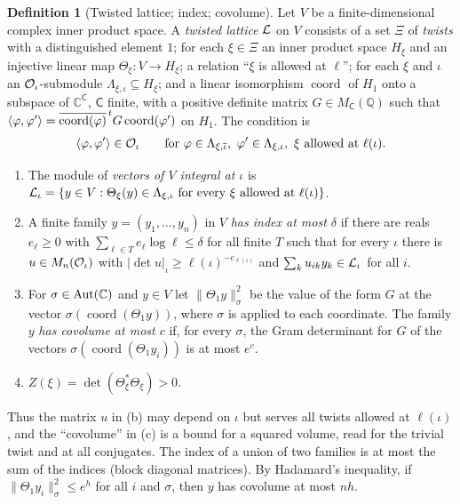 \documentclass[10pt]{amsart}
\theoremstyle{definition}
\newtheorem{definition}[theorem]{Definition}
\theoremstyle{remark}
\newcommand{\C}{\mathbb C}
\newcommand{\Q}{\mathbb Q}
\begin{document}
\begin{definition}[Twisted lattice; index; covolume]\label{def:au-lattice}
Let $V$ be a finite-dimensional complex inner product space. A \emph{twisted lattice} $\mathcal L$ on
$V$ consists of a set $\Xi$ of \emph{twists} with a distinguished element $1$; for each
$\xi\in\Xi$ an inner product space $H_\xi$ and an injective linear map
$\Theta_\xi\colon V\to H_\xi$; a relation ``$\xi$ is allowed at $\ell$''; for each $\xi$ and
$\iota$ an $\mathcal O_\iota$-submodule $\Lambda_{\xi,\iota}\subseteq H_\xi$; and a linear isomorphism
$\operatorname{coord}$ of $H_1$ onto a subspace of $\C^{\mathsf C}$, $\mathsf C$ finite, with a
positive definite matrix $G\in M_{\mathsf C}(\Q)$ such that
$\langle\varphi,\varphi'\rangle=\overline{\operatorname{coord}(\varphi)}^{\,t}G\operatorname{coord}(\varphi')$
on $H_1$. The condition is
\begin{equation}\label{eq:au-pairing}
\langle\varphi,\varphi'\rangle\in\mathcal O_\iota\qquad\text{for }\varphi\in\Lambda_{\xi,\overline{\iota}},\
\varphi'\in\Lambda_{\xi,\iota},\ \xi\text{ allowed at }\ell(\iota).
\end{equation}
\begin{enumerate}
\item[(a)] The module of \emph{vectors of $V$ integral at $\iota$} is
$\mathcal L_\iota=\{y\in V:\Theta_\xi(y)\in\Lambda_{\xi,\iota}\text{ for every }\xi\text{ allowed at }
\ell(\iota)\}$.
\item[(b)] A finite family $y=(y_1,\dots,y_n)$ in $V$ \emph{has index at most $\delta$} if there
are reals $e_\ell\ge0$ with $\sum_{\ell\in T}e_\ell\log\ell\le\delta$ for all finite $T$ such
that for every $\iota$ there is $u\in M_n(\mathcal O_\iota)$ with $|\det u|_\iota\ge
\ell(\iota)^{-e_{\ell(\iota)}}$ and $\sum_ku_{ik}y_k\in\mathcal L_\iota$ for all $i$.
\item[(c)] For $\sigma\in\auAut(\C)$ and $y\in V$ let $\|\Theta_1y\|_\sigma^2$ be the value of the
form $G$ at the vector $\sigma(\operatorname{coord}(\Theta_1y))$, where $\sigma$ is applied to
each coordinate. The family $y$ \emph{has covolume at most $c$} if, for every $\sigma$, the Gram
determinant for $G$ of the vectors $\sigma(\operatorname{coord}(\Theta_1y_i))$ is at most $e^c$.
\item[(d)] $Z(\xi)=\det(\Theta_\xi^*\Theta_\xi)>0$.
\end{enumerate}
\end{definition}

Thus the matrix $u$ in (b) may depend on $\iota$ but serves all twists allowed at $\ell(\iota)$,
and the ``covolume'' in (c) is a bound for a squared volume, read for the trivial twist and at all
conjugates. The index of a union of two families is at most the sum of the indices (block diagonal
matrices). By Hadamard's inequality, if $\|\Theta_1y_i\|_\sigma^2\le e^h$ for all $i$ and $\sigma$,
then $y$ has covolume at most $nh$.
\end{document}

